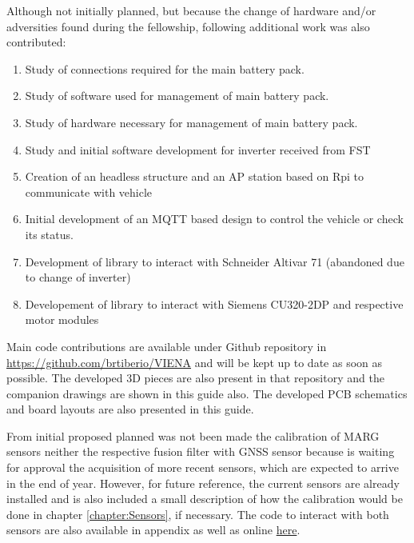 Although not initially planned, but because the change of hardware and/or adversities found during the fellowship, following additional work was also contributed:
\begin{enumerate}
	\tightlist
	\item Study of connections required for the main battery pack.
	\item Study of software used for management of main battery pack.
	\item Study of hardware necessary for management of main battery pack.
	\item Study and initial software development  for inverter received from \acrshort{FST}
	\item Creation of an headless structure and an AP station based on \gls{Rpi} to communicate with vehicle
	\item Initial development of an \acrshort{MQTT} based design to control the vehicle or check its status. 
	\item Development of library to interact with Schneider Altivar 71 (abandoned due to change of inverter)
	\item Developement of library to interact with Siemens CU320-2DP and respective motor modules
\end{enumerate}

Main code contributions are available under Github repository in \url{https://github.com/brtiberio/VIENA} and will be kept up to date as soon as possible.
The developed 3D pieces are also present in that repository and the companion drawings are shown in this guide also.
The developed PCB schematics and board layouts are also presented in this guide.

From initial proposed planned was not been made the calibration of \gls{MARG} sensors   neither the respective fusion filter with \gls{GNSS} sensor because is waiting for approval the acquisition of more recent sensors, which are expected to arrive in the end of year. However, for future reference, the current sensors are already installed and is also included a small description of how the calibration would be done in chapter \ref{chapter:Sensors}, if necessary. The code to interact with both sensors are also available in appendix as well as online \href{https://github.com/brtiberio/logger_AHRS}{here}.





